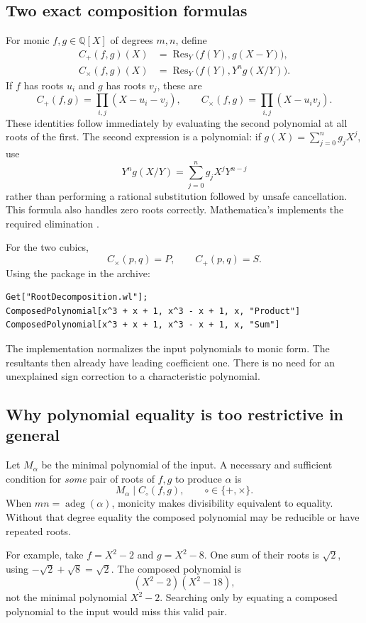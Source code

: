 \documentclass[11pt]{article}
\newcommand{\Q}{\mathbb Q}
\newcommand{\Res}{\operatorname{Res}}
\newcommand{\adeg}{\operatorname{adeg}}
\newcommand{\code}[1]{\texttt{\detokenize{#1}}}
\theoremstyle{definition}\newtheorem{definition}[theorem]{Definition}
\theoremstyle{remark}\newtheorem{remark}[theorem]{Remark}
\begin{document}
\subsection{Two exact composition formulas}
For monic $f,g\in\Q[X]$ of degrees $m,n$, define
\begin{align}
 C_+(f,g)(X)&=\Res_Y\bigl(f(Y),g(X-Y)\bigr),\label{eq:sumres}\\
 C_\times(f,g)(X)&=\Res_Y\bigl(f(Y),Y^n g(X/Y)\bigr).\label{eq:prodres}
\end{align}
If $f$ has roots $u_i$ and $g$ has roots $v_j$, these are
\[
 C_+(f,g)=\prod_{i,j}(X-u_i-v_j),\qquad
 C_\times(f,g)=\prod_{i,j}(X-u_iv_j).
\]
These identities follow immediately by evaluating the second polynomial at
all roots of the first. The second expression is a polynomial: if
$g(X)=\sum_{j=0}^{n}g_jX^j$, use
\[
 Y^n g(X/Y)=\sum_{j=0}^{n}g_jX^jY^{n-j}
\]
rather than performing a rational substitution followed by unsafe cancellation.
This formula also handles zero roots correctly. Mathematica's
\code{Resultant} implements the required elimination \cite{resultant}.

For the two cubics,
\[
 C_\times(p,q)=P,\qquad C_+(p,q)=S.
\]
Using the package in the archive:
\begin{lstlisting}
Get["RootDecomposition.wl"];
ComposedPolynomial[x^3 + x + 1, x^3 - x + 1, x, "Product"]
ComposedPolynomial[x^3 + x + 1, x^3 - x + 1, x, "Sum"]
\end{lstlisting}
The implementation normalizes the input polynomials to monic form. The
resultants then already have leading coefficient one. There is no need for
an unexplained sign correction to a characteristic polynomial.

\subsection{Why polynomial equality is too restrictive in general}
Let $M_\alpha$ be the minimal polynomial of the input. A necessary and
sufficient condition for \emph{some} pair of roots of $f,g$ to produce
$\alpha$ is
\[
 M_\alpha\mid C_\circ(f,g),\qquad \circ\in\{+,\times\}.
\]
When $mn=\adeg(\alpha)$, monicity makes divisibility equivalent to equality.
Without that degree equality the composed polynomial may be reducible or
have repeated roots.

For example, take $f=X^2-2$ and $g=X^2-8$. One sum of their roots is $\sqrt2$,
using $-\sqrt2+\sqrt8=\sqrt2$. The composed polynomial is
\[
 (X^2-2)(X^2-18),
\]
not the minimal polynomial $X^2-2$. Searching only by equating a composed
polynomial to the input would miss this valid pair.
\end{document}
